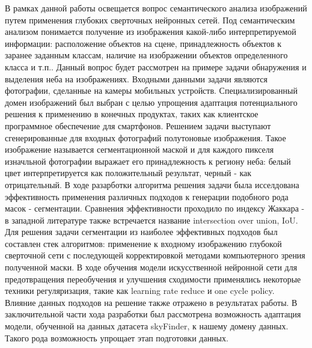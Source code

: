 





\Intro

В рамках данной работы освещается вопрос семантического анализа изображений путем применения глубоких сверточных нейронных сетей. Под семантическим анализом понимается получение из изображения какой-либо интерпретируемой информации: расположение объектов на сцене, принадлежность объектов к заранее заданным классам, наличие на изображении объектов определенного класса и т.п.. Данный вопрос будет рассмотрен на примере задачи обнаружения и выделения неба на изображениях. Входными данными задачи являются фотографии, сделанные на камеры мобильных устройств. Специализированный домен изображений был выбран с целью упрощения адаптация потенциального решения к применению в конечных продуктах, таких как клиентское программное обеспечение для смартфонов. Решением задачи выступают сгенерированные для входных фотографий полутоновые изображения. Такое изображение называется сегментационной маской и для каждого пикселя изначльной фотографии выражает его принадлежность к региону неба: белый цвет интерпретируется как положительный результат, черный - как отрицательный. В ходе разарботки алгоритма решения задачи была исселдована эффективность применения различных подходов к генерации подобного рода масок - сегментации. Сравнения эффективности проходило по индексу Жаккара - в западной литературе также встречается название intersection over union, IoU. Для решения задачи сегментации из наиболее эффективных подходов был составлен стек алгоритмов: применение к входному изображению глубокой сверточной сети с последующей корректировкой методами компьютерного зрения полученной маски. В ходе обучения модели искусственной нейронной сети для предотвращения переобучения и улучшения сходимости применялись некоторые техники регуляризация, такие как learning rate reduce и one cycle policy. Влияние данных подходов на решение также отражено в результатах работы. В заключительной части хода разработки был рассмотрена возможность адаптация модели, обученной на данных датасета skyFinder, к нашему домену данных. Такого рода возможность упрощает этап подготовки данных.

